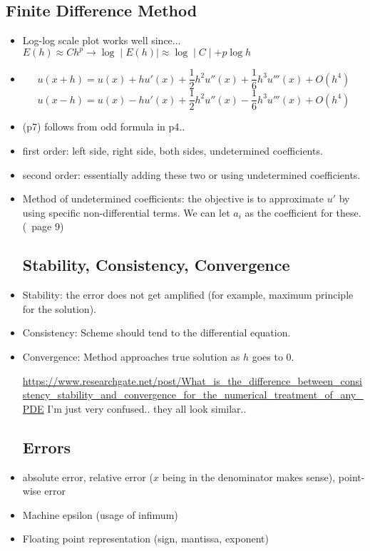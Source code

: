 \documentclass{article}
\theoremstyle{remark}
\begin{document}
    \subsection*{Finite Difference Method}
    \begin{itemize}
\item Log-log scale plot works well since... $E(h)\approx Ch^p\to \log\mid E(h)\mid\approx \log\mid C\mid + p\log h$
\item $$u(x+h)=u(x)+hu'(x)+\frac 12 h^2 u''(x)+\frac 16 h^3u'''(x)+O(h^4)$$
$$u(x-h)=u(x)-hu'(x)+\frac 12h^2u''(x)-\frac 16h^3 u'''(x)+O(h^4)$$
\item (p7) follows from odd formula in p4..
\item first order: left side, right side, both sides, undetermined coefficients.
\item second order: essentially adding these two or using undetermined coefficients.
\item Method of undetermined coefficients: the objective is to approximate $u'$ by using specific non-differential terms. We can let $a_i$ as the coefficient for these. (~page 9)

\subsection*{Stability, Consistency, Convergence}
    \item Stability: the error does not get amplified (for example, maximum principle for the solution).
    
    \item Consistency: Scheme should tend to the differential equation.

    \item Convergence: Method approaches true solution as $h$ goes to $0$.


\url{https://www.researchgate.net/post/What_is_the_difference_between_consistency_stability_and_convergence_for_the_numerical_treatment_of_any_PDE} I'm just very confused.. they all look similar..

\subsection*{Errors}
\item absolute error, relative error ($x$ being in the denominator makes sense), point-wise error
\item Machine epsilon (usage of infimum)
\item Floating point representation (sign, mantissa, exponent)


\end{itemize}
\end{document}
